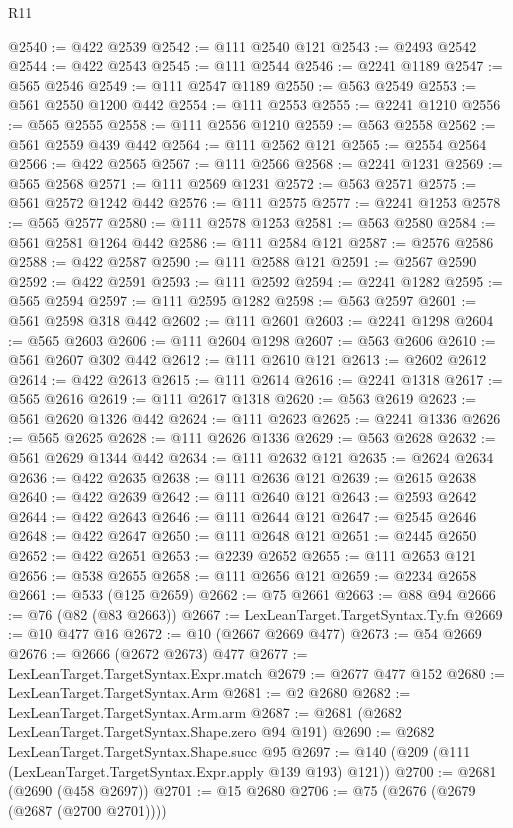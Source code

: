 \begin{lexlean}{R11}
\begin{coremodule}
{{{{{{{{{{{{{{{{{{{{{{{{{{{{{{{{{{{{{{{{{{{{{{{{{{{{{{{{{{{{{{{{{{{{{{{{{{{{{{{{{{@2540 := @422 @2539
@2542 := @111 @2540 @121
@2543 := @2493 @2542
@2544 := @422 @2543
@2545 := @111 @2544
@2546 := @2241 @1189
@2547 := @565 @2546
@2549 := @111 @2547 @1189
@2550 := @563 @2549
@2553 := @561 @2550 @1200 @442
@2554 := @111 @2553
@2555 := @2241 @1210
@2556 := @565 @2555
@2558 := @111 @2556 @1210
@2559 := @563 @2558
@2562 := @561 @2559 @439 @442
@2564 := @111 @2562 @121
@2565 := @2554 @2564
@2566 := @422 @2565
@2567 := @111 @2566
@2568 := @2241 @1231
@2569 := @565 @2568
@2571 := @111 @2569 @1231
@2572 := @563 @2571
@2575 := @561 @2572 @1242 @442
@2576 := @111 @2575
@2577 := @2241 @1253
@2578 := @565 @2577
@2580 := @111 @2578 @1253
@2581 := @563 @2580
@2584 := @561 @2581 @1264 @442
@2586 := @111 @2584 @121
@2587 := @2576 @2586
@2588 := @422 @2587
@2590 := @111 @2588 @121
@2591 := @2567 @2590
@2592 := @422 @2591
@2593 := @111 @2592
@2594 := @2241 @1282
@2595 := @565 @2594
@2597 := @111 @2595 @1282
@2598 := @563 @2597
@2601 := @561 @2598 @318 @442
@2602 := @111 @2601
@2603 := @2241 @1298
@2604 := @565 @2603
@2606 := @111 @2604 @1298
@2607 := @563 @2606
@2610 := @561 @2607 @302 @442
@2612 := @111 @2610 @121
@2613 := @2602 @2612
@2614 := @422 @2613
@2615 := @111 @2614
@2616 := @2241 @1318
@2617 := @565 @2616
@2619 := @111 @2617 @1318
@2620 := @563 @2619
@2623 := @561 @2620 @1326 @442
@2624 := @111 @2623
@2625 := @2241 @1336
@2626 := @565 @2625
@2628 := @111 @2626 @1336
@2629 := @563 @2628
@2632 := @561 @2629 @1344 @442
@2634 := @111 @2632 @121
@2635 := @2624 @2634
@2636 := @422 @2635
@2638 := @111 @2636 @121
@2639 := @2615 @2638
@2640 := @422 @2639
@2642 := @111 @2640 @121
@2643 := @2593 @2642
@2644 := @422 @2643
@2646 := @111 @2644 @121
@2647 := @2545 @2646
@2648 := @422 @2647
@2650 := @111 @2648 @121
@2651 := @2445 @2650
@2652 := @422 @2651
@2653 := @2239 @2652
@2655 := @111 @2653 @121
@2656 := @538 @2655
@2658 := @111 @2656 @121
@2659 := @2234 @2658
@2661 := @533 (@125 @2659)
@2662 := @75 @2661
@2663 := @88 @94
@2666 := @76 (@82 (@83 @2663))
@2667 := LexLeanTarget.TargetSyntax.Ty.fn
@2669 := @10 @477 @16
@2672 := @10 (@2667 @2669 @477)
@2673 := @54 @2669
@2676 := @2666 (@2672 @2673) @477
@2677 := LexLeanTarget.TargetSyntax.Expr.match
@2679 := @2677 @477 @152
@2680 := LexLeanTarget.TargetSyntax.Arm
@2681 := @2 @2680
@2682 := LexLeanTarget.TargetSyntax.Arm.arm
@2687 := @2681 (@2682 LexLeanTarget.TargetSyntax.Shape.zero @94 @191)
@2690 := @2682 LexLeanTarget.TargetSyntax.Shape.succ @95
@2697 := @140 (@209 (@111 (LexLeanTarget.TargetSyntax.Expr.apply @139 @193) @121))
@2700 := @2681 (@2690 (@458 @2697))
@2701 := @15 @2680
@2706 := @75 (@2676 (@2679 (@2687 (@2700 @2701))))
}}}}}}}}}}}}}}}}}}}}}}}}}}}}}}}}}}}}}}}}}}}}}}}}}}}}}}}}}}}}}}}}}}}}}}}}}}}}}}}}}}
\end{coremodule}
\end{lexlean}
